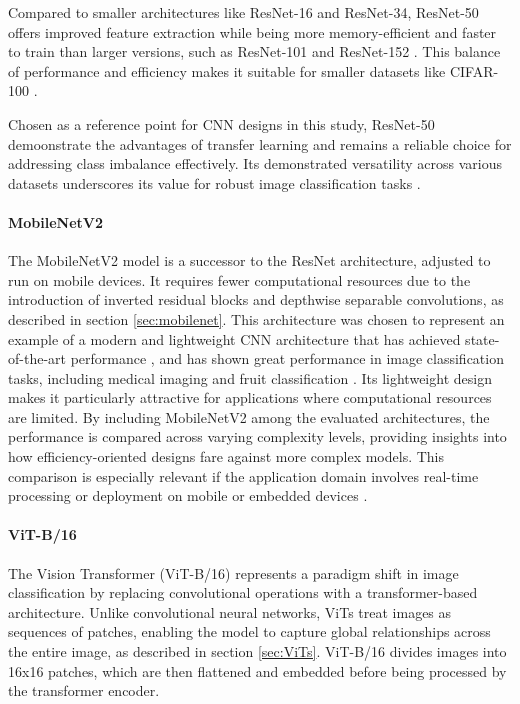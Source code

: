 Compared to smaller architectures like ResNet-16 and ResNet-34, ResNet-50 offers improved feature extraction while being more memory-efficient and faster to train than larger versions, such as ResNet-101 and ResNet-152 \cite{he2015deepresiduallearningimage}. This balance of performance and efficiency makes it suitable for smaller datasets like CIFAR-100 \cite{10083966}.

Chosen as a reference point for CNN designs in this study, ResNet-50 demoonstrate the advantages of transfer learning and remains a reliable choice for addressing class imbalance effectively. Its demonstrated versatility across various datasets underscores its value for robust image classification tasks \cite{he2015deepresiduallearningimage,yun2019cutmixregularizationstrategytrain,}.

\paragraph{MobileNetV2}
The MobileNetV2 model  is a successor to the ResNet architecture, adjusted to run on mobile devices. It requires fewer computational resources due to the introduction of inverted residual blocks and depthwise separable convolutions, as described in section \ref{sec:mobilenet}. This architecture was chosen to represent an example of a modern and lightweight CNN architecture that has achieved state-of-the-art performance \cite{sandler2018mobilenetv2}, and has shown great performance in image classification tasks, including medical imaging \cite{surya2024enhancedbreastcancertumor} and fruit classification \cite{10112802, shahi2022fruit}. Its lightweight design makes it particularly attractive for applications where computational resources are limited. By including MobileNetV2 among the evaluated architectures, the performance is compared across varying complexity levels, providing insights into how efficiency-oriented designs fare against more complex models. This comparison is especially relevant if the application domain involves real-time processing or deployment on mobile or embedded devices \cite{sandler2018mobilenetv2}. 


\paragraph{ViT-B/16}
The Vision Transformer (ViT-B/16) \cite{dosovitskiy2021imageworth16x16words} represents a paradigm shift in image classification by replacing convolutional operations with a transformer-based architecture. Unlike convolutional neural networks, ViTs treat images as sequences of patches, enabling the model to capture global relationships across the entire image, as described in section \ref{sec:ViTs}. ViT-B/16 divides images into 16x16 patches, which are then flattened and embedded before being processed by the transformer encoder.

